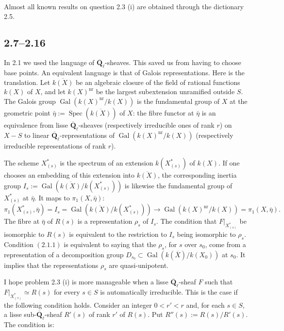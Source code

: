 \documentclass[11pt]{article}
\newcommand{\Qbar}{\overline{\mathbf Q}}
\newcommand{\Spec}{\operatorname{Spec}}
\newcommand{\Gal}{\operatorname{Gal}}
\begin{document}
Almost all known results on question 2.3 (i) are obtained through the dictionary 2.5.

\subsection{2.7--2.16}
In 2.1 we used the language of \(\Qbar_\ell\)-sheaves. This saved us from having to choose base points. An equivalent language is that of Galois representations. Here is the translation. Let \(\overline{k(X)}\) be an algebraic closure of the field of rational functions \(k(X)\) of \(X\), and let \(k(X)^{\mathrm{nr}}\) be the largest subextension unramified outside \(S\). The Galois group \(\Gal(k(X)^{\mathrm{nr}}/k(X))\) is the fundamental group of \(X\) at the geometric point \(\bar\eta:=\Spec(\overline{k(X)})\) of \(X\): the fibre functor at \(\bar\eta\) is an equivalence from lisse \(\Qbar_\ell\)-sheaves (respectively irreducible ones of rank \(r\)) on \(X-S\) to linear \(\Qbar_\ell\)-representations of \(\Gal(k(X)^{\mathrm{nr}}/k(X))\) (respectively irreducible representations of rank \(r\)).

The scheme \(X^*_{(s)}\) is the spectrum of an extension \(k(X^*_{(s)})\) of \(k(X)\). If one chooses an embedding of this extension into \(\overline{k(X)}\), the corresponding inertia group
\(I_s:=\Gal(\overline{k(X)}/k(X^*_{(s)}))\) is likewise the fundamental group of \(X^*_{(s)}\) at \(\bar\eta\). It maps to \(\pi_1(X,\bar\eta)\):
\begin{equation}\tag{2.7.1}
\pi_1(X^*_{(s)},\bar\eta)=I_s=\Gal(\overline{k(X)}/k(X^*_{(s)}))\to \Gal(k(X)^{\mathrm{nr}}/k(X))=\pi_1(X,\bar\eta).
\end{equation}
The fibre at \(\bar\eta\) of \(R(s)\) is a representation \(\rho_s\) of \(I_s\). The condition that \(F|_{X^*_{(s)}}\) be isomorphic to \(R(s)\) is equivalent to the restriction to \(I_s\) being isomorphic to \(\rho_s\). Condition \((2.1.1)\) is equivalent to saying that the \(\rho_s\), for \(s\) over \(s_0\), come from a representation of a decomposition group \(D_{s_0}\subset\Gal(k(\overline X)/k(X_0))\) at \(s_0\). It implies that the representations \(\rho_s\) are quasi-unipotent.

I hope problem 2.3 (i) is more manageable when a lisse \(\Qbar_\ell\)-sheaf \(F\) such that \(F|_{X^*_{(s)}}\simeq R(s)\) for every \(s\in S\) is automatically irreducible. This is the case if the following condition holds. Consider an integer \(0<r'<r\) and, for each \(s\in S\), a lisse sub-\(\Qbar_\ell\)-sheaf \(R'(s)\) of rank \(r'\) of \(R(s)\). Put \(R''(s):=R(s)/R'(s)\). The condition is:
\end{document}
